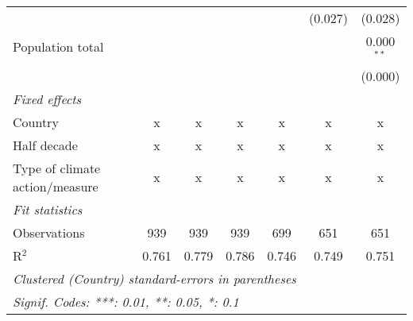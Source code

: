 \begin{tabular}{lcccccc}
                                                                             &         &                &                &                & (0.027)        & (0.028)\\   
   Population total                                                          &         &                &                &                &                & 0.000$^{**}$\\   
                                                                             &         &                &                &                &                & (0.000)\\   
   \emph{Fixed effects}\\
   Country                                                                   & x       & x              & x              & x              & x              & x\\  
   Half decade                                                               & x       & x              & x              & x              & x              & x\\  
   Type of climate action/measure                                            & x       & x              & x              & x              & x              & x\\  
   \midrule \emph{Fit statistics}\\
   Observations                                                              & 939     & 939            & 939            & 699            & 651            & 651\\  
   R$^2$                                                                     & 0.761   & 0.779          & 0.786          & 0.746          & 0.749          & 0.751\\  
   \midrule
   \multicolumn{7}{l}{\emph{Clustered (Country) standard-errors in parentheses}}\\
   \multicolumn{7}{l}{\emph{Signif. Codes: ***: 0.01, **: 0.05, *: 0.1}}\\
\end{tabular}
\par\endgroup


